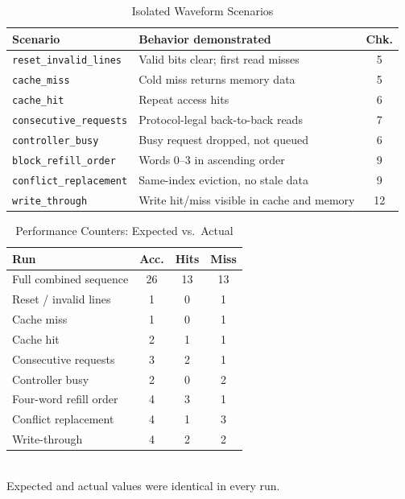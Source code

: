 \documentclass[conference,a4paper]{IEEEtran}
\begin{document}
\begin{table}[!t]
\caption{Isolated Waveform Scenarios}\label{tab:scen}
\centering
\renewcommand{\arraystretch}{1.1}
\begin{tabular}{@{}p{3.4cm}p{3.3cm}c@{}}
\toprule
\textbf{Scenario} & \textbf{Behavior demonstrated} & \textbf{Chk.}\\
\midrule
\texttt{reset\_invalid\_lines} & Valid bits clear; first read misses & 5\\
\texttt{cache\_miss} & Cold miss returns memory data & 5\\
\texttt{cache\_hit} & Repeat access hits & 6\\
\texttt{consecutive\_requests} & Protocol-legal back-to-back reads & 7\\
\texttt{controller\_busy} & Busy request dropped, not queued & 6\\
\texttt{block\_refill\_order} & Words 0--3 in ascending order & 9\\
\texttt{conflict\_replacement} & Same-index eviction, no stale data & 9\\
\texttt{write\_through} & Write hit/miss visible in cache and memory & 12\\
\bottomrule
\end{tabular}
\end{table}

\begin{table}[!t]
\caption{Performance Counters: Expected vs.\ Actual}\label{tab:cnt}
\centering
\renewcommand{\arraystretch}{1.1}
\begin{tabular}{@{}lccc@{}}
\toprule
\textbf{Run} & \textbf{Acc.} & \textbf{Hits} & \textbf{Miss}\\
\midrule
Full combined sequence & 26 & 13 & 13\\
Reset / invalid lines & 1 & 0 & 1\\
Cache miss & 1 & 0 & 1\\
Cache hit & 2 & 1 & 1\\
Consecutive requests & 3 & 2 & 1\\
Controller busy & 2 & 0 & 2\\
Four-word refill order & 4 & 3 & 1\\
Conflict replacement & 4 & 1 & 3\\
Write-through & 4 & 2 & 2\\
\bottomrule
\end{tabular}\\[2pt]
{\footnotesize Expected and actual values were identical in every run.}
\end{table}
\end{document}
